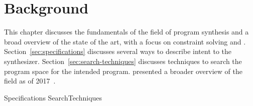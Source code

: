 \chapter{Background}
\label{chapter:background}

This chapter discusses the fundamentals of the field of program synthesis and a
broad overview of the state of the art, with a focus on constraint solving and
.
Section~\ref{sec:specifications} discusses several ways to describe intent to
the synthesizer.
Section~\ref{sec:search-techniques} discusses techniques to search the program
space for the intended program.
\citeauthor{Gulwani2017} presented a broader overview of the field as of
2017~\cite{Gulwani2017}.

{Specifications}
{SearchTechniques}